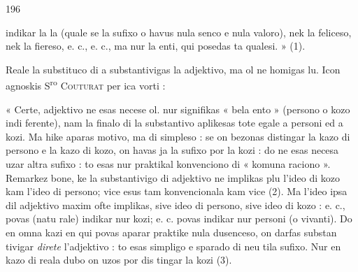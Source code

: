 \begin{VUpage}[200]{196}

\VUcontinue
indikar la  la  (quale se la sufixo  o \nl
havus nula senco e nula valoro), nek  la feliceso, nek\nl
{} la fiereso, e. c., e. c., ma nur la enti, qui posedas ta\nl
qualesi. » (1).

Reale la substituco di  a  substantivigas la adjektivo,\nl
ma ol ne homigas lu. Icon agnoskis S\textsuperscript{ro} \textsc{Couturat} per ica\nl
vorti :

« Certe,  adjektivo ne esas necese \nl
ol.  nur signifikas « bela ento » (persono o kozo indi\cc
ferente), nam la finalo  di la substantivo aplikesas tote\nl
egale a personi ed a kozi. Ma hike aparas motivo, \nl
{} ma di simpleso : se on bezonas distingar la kazo\nl
di persono e la kazo di kozo, on havas ja la sufixo  por\nl
la kozi : do ne esas necesa uzar altra sufixo : to esas nur\nl
praktikal konvenciono di « komuna raciono ». Remarkez\nl
bone, ke la substantivigo di adjektivo ne implikas plu l'ideo\nl
di kozo kam l'ideo di persono;  vice  esus tam\nl
konvencionala kam  vice  (2). Ma l'ideo ipsa\nl
dil adjektivo maxim ofte implikas, sive ideo di persono,\nl
sive ideo di kozo :  e. c., povas (natu\cc
rale) indikar nur kozi;  e. c. povas\nl
indikar nur personi (o vivanti). Do en omna kazi en qui\nl
povas aparar praktike nula dusenceso, on darfas substan\cc
tivigar \textit{direte} l'adjektivo : to esas simpligo e sparado di neu\cc
tila sufixo. Nur en kazo di reala dubo on uzos  por dis\cc
tingar la kozi (3).
\end{VUpage}

